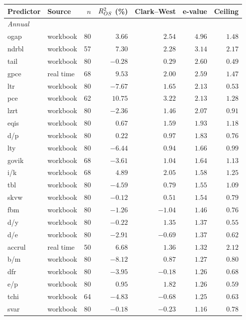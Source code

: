 \begin{tabular}{llrrrrr}
    \toprule
    Predictor & Source & $n$ & $R^2_{OS}$ (\%) & Clark--West & e-value & Ceiling \\
    \midrule
    \multicolumn{7}{l}{\emph{Annual}} \\
    ogap & workbook & 80 & $3.66$ & $2.54$ & $4.96$ & $1.48$ \\
    ndrbl & workbook & 57 & $7.30$ & $2.28$ & $3.14$ & $2.17$ \\
    tail & workbook & 80 & $-0.28$ & $0.29$ & $2.60$ & $0.49$ \\
    gpce & real time & 68 & $9.53$ & $2.00$ & $2.59$ & $1.47$ \\
    ltr & workbook & 80 & $-7.67$ & $1.65$ & $2.13$ & $0.53$ \\
    pce & workbook & 62 & $10.75$ & $3.22$ & $2.13$ & $1.28$ \\
    lzrt & workbook & 80 & $-2.36$ & $1.46$ & $2.07$ & $0.91$ \\
    eqis & workbook & 80 & $0.67$ & $1.59$ & $1.93$ & $1.18$ \\
    d/p & workbook & 80 & $0.22$ & $0.97$ & $1.83$ & $0.76$ \\
    lty & workbook & 80 & $-6.44$ & $0.94$ & $1.66$ & $0.99$ \\
    govik & workbook & 68 & $-3.61$ & $1.04$ & $1.64$ & $1.13$ \\
    i/k & workbook & 68 & $4.89$ & $2.05$ & $1.58$ & $1.25$ \\
    tbl & workbook & 80 & $-4.59$ & $0.79$ & $1.55$ & $1.09$ \\
    skvw & workbook & 80 & $-0.12$ & $0.51$ & $1.54$ & $0.79$ \\
    fbm & workbook & 80 & $-1.26$ & $-1.04$ & $1.46$ & $0.76$ \\
    d/y & workbook & 80 & $-0.22$ & $1.35$ & $1.37$ & $0.55$ \\
    d/e & workbook & 80 & $-2.91$ & $-0.69$ & $1.37$ & $0.62$ \\
    accrul & real time & 50 & $6.68$ & $1.36$ & $1.32$ & $2.12$ \\
    b/m & workbook & 80 & $-8.12$ & $0.87$ & $1.27$ & $0.80$ \\
    dfr & workbook & 80 & $-3.95$ & $-0.18$ & $1.26$ & $0.68$ \\
    e/p & workbook & 80 & $0.95$ & $1.82$ & $1.26$ & $0.59$ \\
    tchi & workbook & 64 & $-4.83$ & $-0.68$ & $1.25$ & $0.63$ \\
    svar & workbook & 80 & $-0.18$ & $-0.23$ & $1.16$ & $0.78$ \\

\end{tabular}
